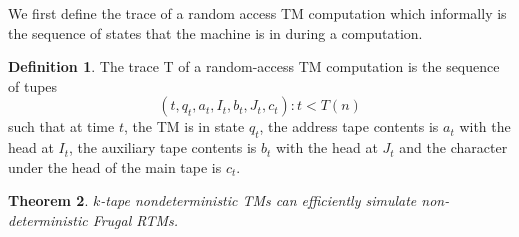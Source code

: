 \documentclass[english]{article}
\theoremstyle{plain}
\newtheorem{thm}{Theorem}
\theoremstyle{definition}
\newtheorem{defn}[thm]{Definition}
\theoremstyle{plain}
\begin{document}
We first define the trace of a random access TM computation which
informally is the sequence of states that the machine is in during a
computation.

\begin{defn}
  The trace T of a random-access TM computation is the sequence of tupes
\[
(t,q_t,a_t,I_t,b_t,J_t,c_t): t < T(n)
\]
  such that at time $t$, the TM is in state $q_t$, the address tape
  contents is $a_t$ with the head at $I_t$, the auxiliary tape
  contents is $b_t$ with the head at $J_t$ and the character under the
  head of the main tape is $c_t$.
\end{defn}

\begin{thm}
  $k$-tape nondeterministic TMs can efficiently simulate
  non-deterministic Frugal RTMs.
\end{thm}
\end{document}
